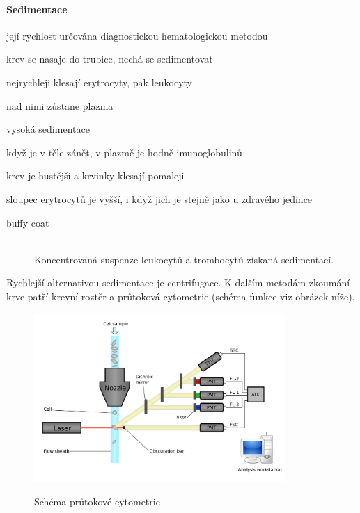 \documentclass[DIV=8]{scrreprt}
\begin{document}
\paragraph{Sedimentace}
\begin{myItemize}[nosep]
    \item její rychlost určována diagnostickou hematologickou metodou
    \item krev se nasaje do trubice, nechá se sedimentovat
\begin{myItemize}[nosep]
    \item nejrychleji klesají erytrocyty, pak leukocyty
    \item nad nimi zůstane plazma
\end{myItemize}

    \item vysoká sedimentace
\begin{myItemize}[nosep]
    \item když je v těle zánět, v plazmě je hodně imunoglobulinů
\begin{myItemize}[nosep]
    \item krev je hustější a krvinky klesají pomaleji
    \item sloupec erytrocytů je vyšší, i když jich je stejně jako u zdravého jedince
\end{myItemize}

\end{myItemize}

\end{myItemize}



\begin{description}
\item[buffy coat]\hfill \\
Koncentrovaná suspenze leukocytů a trombocytů získaná sedimentací.

\end{description}


Rychlejší alternativou sedimentace je centrifugace. K dalším metodám zkoumání krve patří krevní roztěr a průtoková cytometrie (schéma funkce viz obrázek níže).

\begin{figure}
    \caption{Schéma průtokové cytometrie}
    \includegraphics[width=0.85\textwidth]{cytometrie.png}
    \centering
    \label{}
\end{figure}
\end{document}
